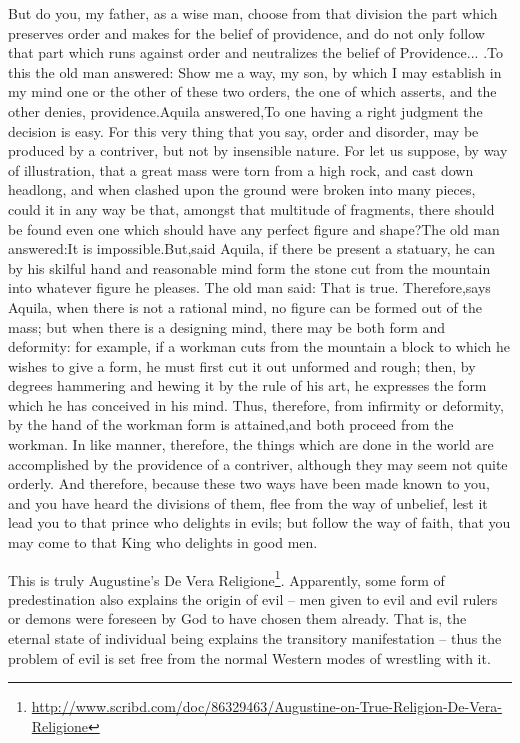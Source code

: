 \begin{quotex}
But do you, my father, as a wise man, choose from that division the part which preserves order and makes for the belief of providence, and do not only follow that part which runs against order and neutralizes the belief of Providence... .To this the old man answered: Show me a way, my son, by which I may establish in my mind one or the other of these two orders, the one of which asserts, and the other denies, providence.Aquila answered,To one having a right judgment the decision is easy. For this very thing that you say, order and disorder, may be produced by a contriver, but not by insensible nature. For let us suppose, by way of illustration, that a great mass were torn from a high rock, and cast down headlong, and when clashed upon the ground were broken into many pieces, could it in any way be that, amongst that multitude of fragments, there should be found even one which should have any perfect figure and shape?The old man answered:It is impossible.But,said Aquila, if there be present a statuary, he can by his skilful hand and reasonable mind form the stone cut from the mountain into whatever figure he pleases. The old man said: That is true. Therefore,says Aquila, when there is not a rational mind, no figure can be formed out of the mass; but when there is a designing mind, there may be both form and deformity: for example, if a workman cuts from the mountain a block to which he wishes to give a form, he must first cut it out unformed and rough; then, by degrees hammering and hewing it by the rule of his art, he expresses the form which he has conceived in his mind. Thus, therefore, from infirmity or deformity, by the hand of the workman form is attained,and both proceed from the workman. In like manner, therefore, the things which are done in the world are accomplished by the providence of a contriver, although they may seem not quite orderly. And therefore, because these two ways have been made known to you, and you have heard the divisions of them, flee from the way of unbelief, lest it lead you to that prince who delights in evils; but follow the way of faith, that you may come to that King who delights in good men.
\end{quotex}


This is truly Augustine's De Vera Religione\footnote{\url{http://www.scribd.com/doc/86329463/Augustine-on-True-Religion-De-Vera-Religione}}. Apparently, some form of predestination also explains the origin of evil -- men given to evil and evil rulers or demons were foreseen by God to have chosen them already. That is, the eternal state of individual being explains the transitory manifestation -- thus the problem of evil is set free from the normal Western modes of wrestling with it.

